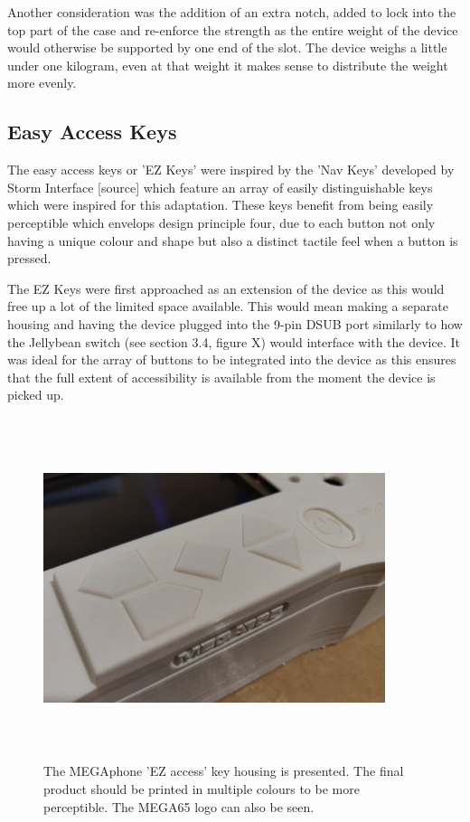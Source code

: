 Another consideration was the addition of an extra notch, added to lock into the top part of the case and re-enforce the strength as the entire weight of the device would otherwise be supported by one end of the slot. %
The device weighs a little under one kilogram, even at that weight it makes sense to distribute the weight more evenly.

\subsection{Easy Access Keys}

The easy access keys or 'EZ Keys' were inspired by the 'Nav Keys' developed by Storm Interface [source] which feature an array of easily distinguishable keys which were inspired for this adaptation.
These keys benefit from being easily perceptible which envelops design principle four, due to each button not only having a unique colour and shape but also a distinct tactile feel when a button is pressed.

The EZ Keys were first approached as an extension of the device as this would free up a lot of the limited space available.
This would mean making a separate housing and having the device plugged into the 9-pin DSUB port similarly to how the Jellybean switch (see section 3.4, figure X) would interface with the device.
It was ideal for the array of buttons to be integrated into the device as this ensures that the full extent of accessibility is available from the moment the device is picked up.

\begin{figure} [h]
    \centering
    \includegraphics[width=10cm,height=10cm,keepaspectratio]{Figures/easy_keys_housing.png}
    \caption{The MEGAphone 'EZ access' key housing is presented. The final product should be printed in multiple colours to be more perceptible. The MEGA65 logo can also be seen.}
    \label{fig:EZkeys}
\end{figure}


